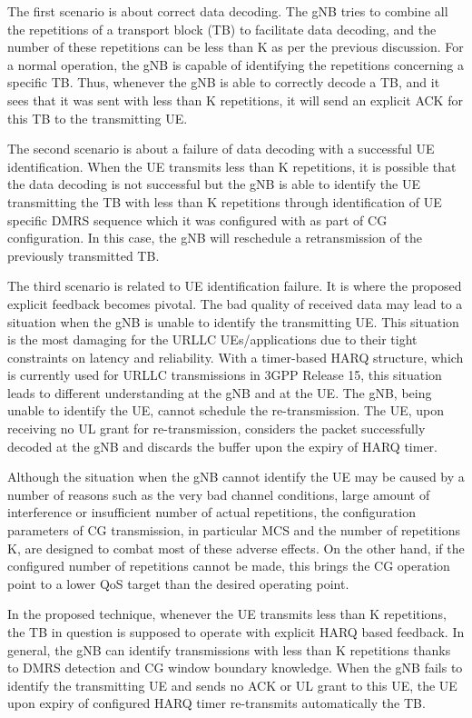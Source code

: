 \documentclass[conference]{IEEEtran}
\begin{document}
The first scenario is about correct data decoding. The gNB tries to combine all the repetitions of a transport block (TB) to facilitate data decoding, and the number of these repetitions can be less than K as per the previous discussion. For a normal operation, the gNB is capable of identifying the repetitions concerning a specific TB. Thus, whenever the gNB is able to correctly decode a TB, and it sees that it was sent with less than K repetitions, it will send an explicit ACK for this TB to the transmitting UE.

The second scenario is about a failure of data decoding with a successful UE identification. When the UE transmits less than K repetitions, it is possible that the data decoding is not successful but the gNB is able to identify the UE transmitting the TB with less than K repetitions through identification of UE specific DMRS sequence which it was configured with as part of CG configuration. In this case, the gNB will reschedule a retransmission of the previously transmitted TB. 

The third scenario is related to UE identification failure. It is where the proposed explicit feedback becomes pivotal. The bad quality of received data may lead to a situation when the gNB is unable to identify the transmitting UE. This situation is the most damaging for the URLLC UEs/applications due to their tight constraints on latency and reliability. With a timer-based HARQ structure, which is currently used for URLLC transmissions in 3GPP Release 15, this situation leads to different understanding at the gNB and at the UE. The gNB, being unable to identify the UE, cannot schedule the re-transmission. The UE, upon receiving no UL grant for re-transmission, considers the packet successfully decoded at the gNB and discards the buffer upon the expiry of HARQ timer.

Although the situation when the gNB cannot identify the UE may be caused by a number of reasons such as the very bad channel conditions, large amount of interference or insufficient number of actual repetitions, the configuration parameters of CG transmission, in particular MCS and the number of repetitions K, are designed to combat most of these adverse effects. On the other hand, if the configured number of repetitions cannot be made, this brings the CG operation point to a lower QoS target than the desired operating point.

In the proposed technique, whenever the UE transmits less than K repetitions, the TB in question is supposed to operate with explicit HARQ based feedback. In general, the gNB can identify transmissions with less than K repetitions thanks to DMRS detection and CG window boundary knowledge. When the gNB fails to identify the transmitting UE and sends no ACK or UL grant to this UE, the UE upon expiry of configured HARQ timer re-transmits automatically the TB. 
\end{document}
